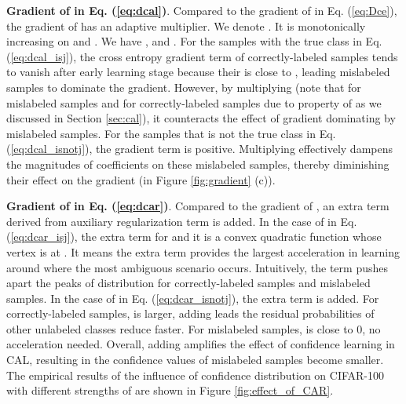 \documentclass{article}
\begin{document}
\textbf{Gradient of  in Eq. (\ref{eq:dcal})}. Compared to the gradient of  in Eq. (\ref{eq:Dce}), the gradient of  has an adaptive multiplier. We denote . It is monotonically increasing on  and . We have , and . For the samples with the true class  in Eq. (\ref{eq:dcal_isj}), the cross entropy gradient term  of correctly-labeled samples tends to vanish after early learning stage because their  is close to , leading mislabeled samples to dominate the gradient. However, by multiplying  (note that  for mislabeled samples and  for correctly-labeled samples due to property of  as we discussed in Section \ref{sec:cal}), it counteracts the effect of gradient dominating by mislabeled samples. For the samples that  is not the true class in Eq. (\ref{eq:dcal_isnotj}), the gradient term  is positive. Multiplying  effectively dampens the magnitudes of coefficients on these mislabeled samples, thereby diminishing their effect on the gradient (in Figure \ref{fig:gradient} (c)). 











\textbf{Gradient of  in Eq. (\ref{eq:dcar})}. Compared to the gradient of , an extra term derived from auxiliary regularization term  is added. In the case of  in Eq. (\ref{eq:dcar_isj}), the extra term  for  and it is a convex quadratic function whose vertex is at . It means the extra term  provides the largest acceleration in learning around  where the most ambiguous scenario occurs. Intuitively, the term  pushes apart the peaks of  distribution for correctly-labeled samples and mislabeled samples. In the case of  in Eq. (\ref{eq:dcar_isnotj}), the extra term  is added. For correctly-labeled samples,  is larger, adding  leads the residual probabilities of other unlabeled classes reduce faster. For mislabeled samples,  is close to 0, no acceleration needed. Overall, adding  amplifies the effect of confidence learning in CAL, resulting in the confidence values of mislabeled samples become smaller. The empirical results of the influence of confidence distribution on CIFAR-100 with different strengths of  are shown in Figure \ref{fig:effect_of_CAR}. 
\end{document}
